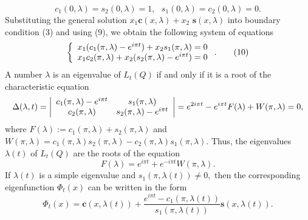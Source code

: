 \documentclass{article}%
\begin{document}
\begin{equation}
c_{1}(0,\lambda)=s_{2}(0,\lambda)=1,\text{ }s_{1}(0,\lambda)=c_{2}%
(0,\lambda)=0. \tag{9}%
\end{equation}
Substituting the general solution $x_{1}\mathbf{c}(x,\lambda)+x_{2}$
$\mathbf{s}(x,\lambda)$ into boundary condition (3) and using (9), we obtain
the following system of equations
\begin{equation}
\left\{
\begin{array}
[c]{c}%
x_{1}(c_{1}(\pi,\lambda)-e^{i\pi t})+x_{2}s_{1}(\pi,\lambda)=0\\
x_{1}c_{2}(\pi,\lambda)+x_{2}(s_{2}(\pi,\lambda)-e^{i\pi t})=0
\end{array}
\right.  . \tag{10}%
\end{equation}
A number $\lambda$ is an eigenvalue of $L_{t}(Q)$ if and only if it is a root
of the characteristic equation
\[
\Delta(\lambda,t)=\left\vert
\begin{array}
[c]{cc}%
c_{1}(\pi,\lambda)-e^{i\pi t} & s_{1}(\pi,\lambda)\\
c_{2}(\pi,\lambda) & s_{2}(\pi,\lambda)-e^{i\pi t}%
\end{array}
\right\vert =e^{2i\pi t}-e^{i\pi t}F(\lambda)+W(\pi,\lambda)=0,
\]
where $F(\lambda):=c_{1}(\pi,\lambda)+s_{2}(\pi,\lambda)$ and $W(\pi
,\lambda)=c_{1}(\pi,\lambda)s_{2}(\pi,\lambda)-c_{2}(\pi,\lambda)s_{1}%
(\pi,\lambda).$ Thus, the eigenvalues $\lambda(t)$ of $L_{t}(Q)$ are the roots
of the equation%
\begin{equation}
F(\lambda)=e^{i\pi t}+e^{-i\pi t}W(\pi,\lambda). \tag{11}%
\end{equation}
If $\lambda(t)$ is a simple eigenvalue and $s_{1}(\pi,\lambda(t))\neq0,$ then
the corresponding eigenfunction $\Phi_{t}(x)$ can be written in the form
\begin{equation}
\Phi_{t}(x)=\mathbf{c}(x,\lambda(t))+\frac{e^{i\pi t}-c_{1}(\pi,\lambda
(t))}{s_{1}(\pi,\lambda(t))}\mathbf{s}(x,\lambda(t)). \tag{12}%
\end{equation}
\end{document}
